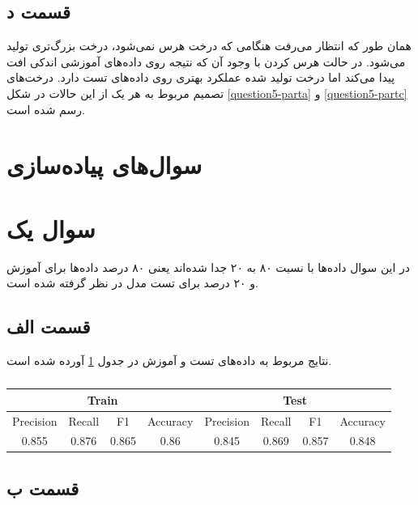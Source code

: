 \documentclass{article}
\begin{document}
\subsection*{قسمت د}

همان طور که انتظار می‌رفت هنگامی که درخت هرس نمی‌شود، درخت بزرگ‌تری تولید می‌شود. در حالت هرس کردن
با وجود آن که نتیجه روی داده‌های آموزشی اندکی افت پیدا می‌کند اما درخت تولید شده عملکرد بهتری
روی داده‌های تست دارد. درخت‌های تصمیم مربوط به هر یک از این حالات در شکل \ref{question5-parta}
و \ref{question5-partc} رسم شده است.

\section*{سوال‌های پیاده‌سازی}

\section*{سوال یک}

در این سوال داده‌ها با نسبت ۸۰ به ۲۰ جدا شده‌اند یعنی ۸۰ درصد داده‌ها برای آموزش و ۲۰ درصد
برای تست مدل در نظر گرفته شده است.

\subsection*{قسمت الف}

نتایج مربوط به داده‌های تست و آموزش در جدول \ref{implementation-q1-parta-metrics}
آورده شده است.

\begin{latin}
\begin{table}[h]
    \centering
    \caption{}
    \begin{tabular}{c|c|c|c|c|c|c|c}
        \multicolumn{4}{c|}{Train} & \multicolumn{4}{|c}{Test} \\
        \hline
        Precision & Recall & F1 & Accuracy & Precision & Recall & F1 & Accuracy \\
        \hline
        0.855 & 0.876 & 0.865 & 0.86 & 0.845 & 0.869 & 0.857 & 0.848
    \end{tabular}
    \label{implementation-q1-parta-metrics}
\end{table}
\end{latin}

\subsection*{قسمت ب}
\end{document}
